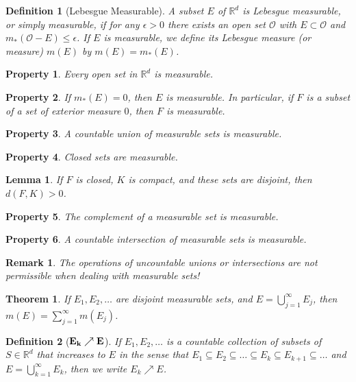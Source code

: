 \documentclass{report}
\theoremstyle{upthm}
\newtheorem{thm}{Theorem}
\newtheorem{defn}{Definition}
\newtheorem{lemma}{Lemma}
\newtheorem{remark}{Remark}
\newtheorem{property}{Property}
\newcommand{\reals}{\mathbb{R}}
\newcommand{\calO}{{\mathcal{O}}}
\newcommand{\union}{\bigcup}
\begin{document}
\begin{defn}[Lebesgue Measurable]
	A subset $E$ of $\reals^d$ is Lebesgue measurable, or simply measurable, if for any $ \epsilon > 0$ there exists an open set $\calO$ with $E \subset \calO$ and $m_*(\calO - E) \leq \epsilon$. If $E$ is measurable, we define its Lebesgue measure (or measure) $m(E)$ by $m(E) = m_*(E)$.
\end{defn}

\begin{property}
	Every open set in $\reals^d$ is measurable.
\end{property}

\begin{property}
	If $m_*(E) = 0$, then $E$ is measurable. In particular, if $F$ is a subset of a set of exterior measure $0$, then $F$ is measurable.
\end{property}

\begin{property}
	A countable union of measurable sets is measurable.
\end{property}

\begin{property}
	Closed sets are measurable.
\end{property}

\begin{lemma}
	If $F$ is closed, $K$ is compact, and these sets are disjoint, then $d(F,K) > 0$.
\end{lemma}

\begin{property}
	The complement of a measurable set is measurable.
\end{property}

\begin{property}
	A countable intersection of measurable sets is measurable.
\end{property}

\begin{remark}
	The operations of uncountable unions or intersections are not permissible when dealing with measurable sets!
\end{remark}

\begin{thm}
	If $E_1, E_2, \dots$ are disjoint measurable sets, and $E = \union_{j=1}^{\infty} E_j$, then $m(E) = \sum_{j=1}^{\infty} m(E_j)$.
\end{thm}

\begin{defn}[$\bf E_k \nearrow E$]
	If $E_1, E_2, \dots $ is a countable collection of subsets of $S \in \reals^d$ that increases to $E$ in the sense that $ E_1 \subseteq E_2 \subseteq \dots \subseteq E_k \subseteq E_{k+1} \subseteq \dots $  and $E = \union_{k=1}^{\infty} E_k$, then we write $E_k \nearrow E$.
\end{defn}
\end{document}
